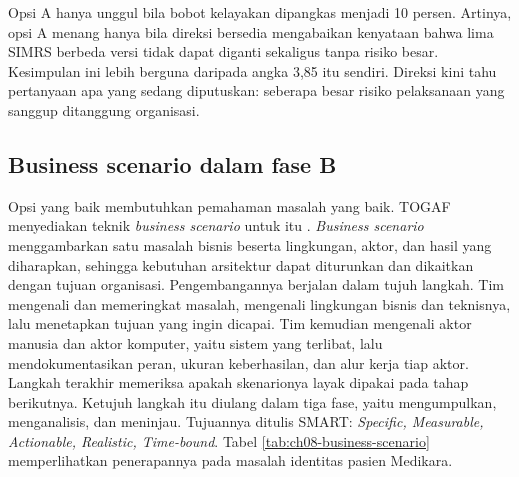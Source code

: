 Opsi A hanya unggul bila bobot kelayakan dipangkas menjadi 10 persen. Artinya, opsi A
menang hanya bila direksi bersedia mengabaikan kenyataan bahwa lima SIMRS berbeda versi
tidak dapat diganti sekaligus tanpa risiko besar. Kesimpulan ini lebih berguna daripada
angka 3,85 itu sendiri. Direksi kini tahu pertanyaan apa yang sedang diputuskan:
seberapa besar risiko pelaksanaan yang sanggup ditanggung organisasi.

\subsection*{Business scenario dalam fase B}

Opsi yang baik membutuhkan pemahaman masalah yang baik. TOGAF menyediakan teknik
\textit{business scenario} untuk itu \cite{c08-togaf-g176}. \textit{Business scenario}
menggambarkan satu masalah bisnis beserta lingkungan, aktor, dan hasil yang diharapkan,
sehingga kebutuhan arsitektur dapat diturunkan dan dikaitkan dengan tujuan organisasi.
Pengembangannya berjalan dalam tujuh langkah. Tim mengenali dan memeringkat masalah,
mengenali lingkungan bisnis dan teknisnya, lalu menetapkan tujuan yang ingin dicapai. Tim
kemudian mengenali aktor manusia dan aktor komputer, yaitu sistem yang terlibat, lalu
mendokumentasikan peran, ukuran keberhasilan, dan alur kerja tiap aktor. Langkah terakhir
memeriksa apakah skenarionya layak dipakai pada tahap berikutnya. Ketujuh langkah itu
diulang dalam tiga fase, yaitu mengumpulkan, menganalisis, dan meninjau. Tujuannya ditulis
SMART: \textit{Specific, Measurable, Actionable, Realistic, Time-bound}. Tabel
\ref{tab:ch08-business-scenario} memperlihatkan penerapannya pada masalah identitas pasien
Medikara.

